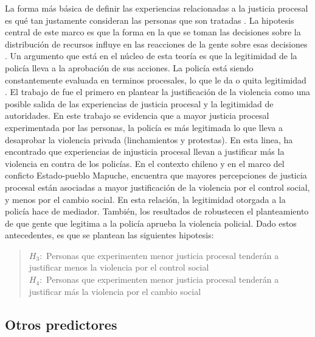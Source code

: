 \documentclass[12pt,twoside]{templates/facsothesis}
\begin{document}
La forma más básica de definir las experiencias relacionadas a la justicia procesal es qué tan justamente consideran las personas que son tratadas \citep{Gonzales2007, Vermunt2016}. La hipotesis central de este marco es que la forma en la que se toman las decisiones sobre la distribución de recursos influye en las reacciones de la gente sobre esas decisiones \citep{Vermunt2016}. Un argumento que está en el núcleo de esta teoría es que la legitimidad de la policía lleva a la aprobación de sus acciones. La policía está siendo constantemente evaluada en terminos procesales, lo que le da o quita legitimidad \citep{Bradford2017}. El trabajo de \citet{Jackson2013} fue el primero en plantear la justificación de la violencia como una posible salida de las experiencias de justicia procesal y la legitimidad de autoridades. En este trabajo se evidencia que a mayor justicia procesal experimentada por las personas, la policía es más legitimada lo que lleva a desaprobar la violencia privada (linchamientos y protestas). En esta linea, \citet{Maguire2016} ha encontrado que experiencias de injusticia procesal llevan a justificar más la violencia en contra de los policías. En el contexto chileno y en el marco del conficto Estado-pueblo Mapuche, \citet{Gerber2017} encuentra que mayores percepciones de justicia procesal están asociadas a mayor justificación de la violencia por el control social, y menos por el cambio social. En esta relación, la legitimidad otorgada a la policía hace de mediador. También, los resultados de \citet{Bradford2017} robustecen el planteamiento de que gente que legitima a la policía aprueba la violencia policial. Dado estos antecedentes, es que se plantean las siguientes hipotesis:

\begin{quote}
\(H_3:\) Personas que experimenten menor justicia procesal tenderán a justificar menos la violencia por el control social\\
\(H_4:\) Personas que experimenten menor justicia procesal tenderán a justificar más la violencia por el cambio social
\end{quote}

\hypertarget{otros-predictores}{%
\subsection{Otros predictores}\label{otros-predictores}}
\end{document}
